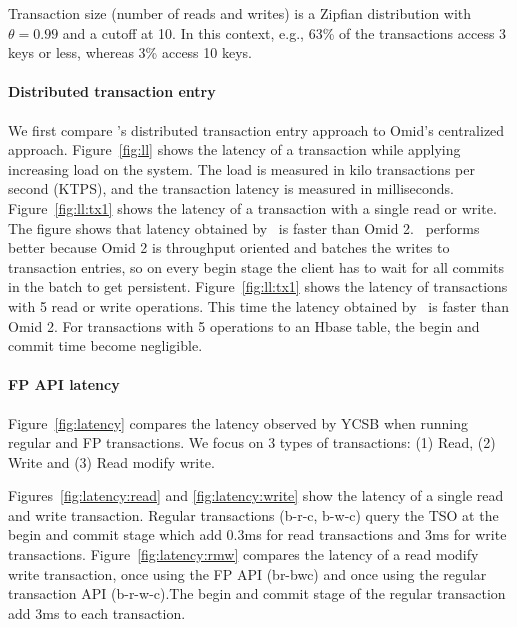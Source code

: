 Transaction size (number of reads and writes) is a Zipfian distribution with $\theta=0.99$ and a cutoff at 10. 
In this context, e.g., 63\% of the transactions access 3 keys or less, whereas 3\% access 10 keys. 

\paragraph{Distributed transaction entry}
We first compare \sys's distributed transaction entry approach to Omid's centralized approach. Figure~\ref{fig:ll} shows the latency of a transaction while applying increasing load on the system. The load is measured in kilo transactions per second (KTPS), and the transaction latency is measured in milliseconds. Figure~\ref{fig:ll:tx1} shows the latency of a transaction with a single read or write. The figure shows that latency obtained by \sys\ is  faster than Omid 2. \sys\ performs better because Omid 2 is throughput oriented and batches the writes to transaction entries, so on every begin stage the client has to wait for all commits in the batch to get persistent.
Figure~\ref{fig:ll:tx1} shows the latency of transactions with 5 read or write operations. This time the latency obtained by \sys\ is  faster than Omid 2. For transactions with 5 operations to an Hbase table, the begin and commit time become negligible.

\paragraph{FP API latency}
Figure~\ref{fig:latency} compares the latency observed by YCSB when running regular and FP transactions.
We focus on 3 types of transactions: (1) Read, (2) Write and (3) Read modify write.

Figures~\ref{fig:latency:read} and \ref{fig:latency:write} show the latency of a single read and write transaction. Regular transactions (b-r-c, b-w-c) query the TSO at the begin and commit stage which add 0.3ms for read transactions and 3ms for write transactions.
Figure~\ref{fig:latency:rmw} compares the latency of a read modify write transaction, once using the FP API (br-bwc) and once using the regular transaction API (b-r-w-c).The begin and commit stage of the regular transaction add 3ms to each transaction.







